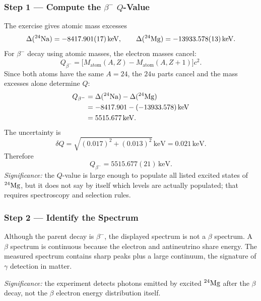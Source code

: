 \subsubsection*{Step 1 --- Compute the $\beta^-$ $Q$-Value}
The exercise gives atomic mass excesses
\begin{equation}
  \label{eq:lec10:mass_excess_values}
  \Delta(\nucleus{Na}{24})=-8417.901(17)\,\text{keV},\qquad
  \Delta(\nucleus{Mg}{24})=-13933.578(13)\,\text{keV}.
\end{equation}
For $\beta^-$ decay using atomic masses, the electron masses cancel:
\begin{equation}
  \label{eq:lec10:beta_minus_q_atomic}
  Q_{\beta^-}
  = \bigl[M_\text{atom}(A,Z)-M_\text{atom}(A,Z+1)\bigr]c^2.
\end{equation}
Since both atoms have the same $A=24$, the $24u$ parts cancel and the mass
excesses alone determine $Q$:
\begin{align}
  \label{eq:lec10:na24_q_calc}
  Q_{\beta^-}
  &= \Delta(\nucleus{Na}{24})-\Delta(\nucleus{Mg}{24}) \nonumber\\
  &= -8417.901 - (-13933.578)\,\text{keV} \nonumber\\
  &= 5515.677\,\text{keV}.
\end{align}
The uncertainty is
\begin{equation}
  \label{eq:lec10:na24_q_uncertainty}
  \delta Q = \sqrt{(0.017)^2+(0.013)^2}\,\text{keV}
  = 0.021\,\text{keV}.
\end{equation}
Therefore
\begin{equation}
  \label{eq:lec10:na24_q_result}
  \boxed{Q_{\beta^-}=5515.677(21)\,\text{keV}.}
\end{equation}
\textit{Significance:} the $Q$-value is large enough to populate all listed
excited states of $\nucleus{Mg}{24}$, but it does not say by itself which levels
are actually populated; that requires spectroscopy and selection rules.

\subsubsection*{Step 2 --- Identify the Spectrum}
Although the parent decay is $\beta^-$, the displayed spectrum is not a
$\beta$ spectrum. A $\beta$ spectrum is continuous because the electron and
antineutrino share energy. The measured spectrum contains sharp peaks plus a
large continuum, the signature of $\gamma$ detection in matter.

\textit{Significance:} the experiment detects photons emitted by excited
$\nucleus{Mg}{24}$ after the $\beta$ decay, not the $\beta$ electron energy
distribution itself.


